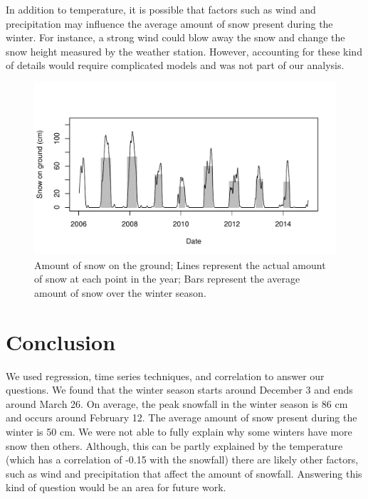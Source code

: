 \documentclass[12pt,twoside]{article}
\begin{document}
{In addition to temperature, it is possible that factors such as wind and precipitation may influence the average amount of snow present during the winter. For instance, a strong wind could blow away the snow and change the snow height measured by the weather station. However, accounting for these kind of details would require complicated models and was not part of our analysis.


\begin{figure}[!ht]
\begin{center}
\includegraphics[width=1.0\textwidth]{report-barplots}
\end{center}
\vspace{-8mm}
\caption{Amount of snow on the ground; Lines represent the actual amount of snow at each point in the year; Bars represent the average amount of snow over the winter season.}
\label{fig:barplots}
\end{figure}


\section{Conclusion}

We used regression, time series techniques, and correlation to answer our questions. We found that the winter season starts around December 3 and ends around March 26. On average, the peak snowfall in the winter season is 86 cm and occurs around February 12. The average amount of snow present during the winter is 50 cm. We were not able to fully explain why some winters have more snow then others. Although, this can be partly explained by the temperature (which has a correlation of -0.15 with the snowfall) there are likely other factors, such as wind and precipitation that affect the amount of snowfall. Answering this kind of question would be an area for future work.

}
\end{document}
